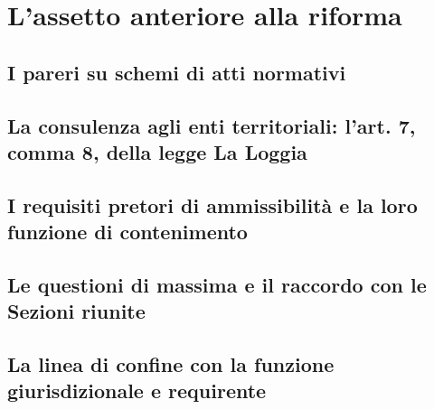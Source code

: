 
\chapter{L'assetto anteriore alla riforma}
\label{cap:cap2}

\section{I pareri su schemi di atti normativi}
\label{sez:cap2:schemiatti}


\section{La consulenza agli enti territoriali: l'art. 7, comma 8, della legge La Loggia}
\label{sez:cap2:laloggia}


\section{I requisiti pretori di ammissibilità e la loro funzione di contenimento}
\label{sez:cap2:requisiti}


\section{Le questioni di massima e il raccordo con le Sezioni riunite}
\label{sez:cap2:qmig}


\section{La linea di confine con la funzione giurisdizionale e requirente}
\label{sez:cap2:confine}


